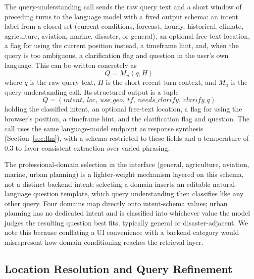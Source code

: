 \documentclass[sigconf,natbib=true,anonymous=true]{acmart}
\begin{document}
The query-understanding call sends the raw query text and a short window of preceding turns to the language model with a fixed output schema: an intent label from a closed set (current conditions, forecast, hourly, historical, climate, agriculture, aviation, marine, disaster, or general), an optional free-text location, a flag for using the current position instead, a timeframe hint, and, when the query is too ambiguous, a clarification flag and question in the user's own language. This can be written concretely as
\begin{equation}
  Q = M_{u}(q, H)
  \label{eq:understanding}
\end{equation}
where $q$ is the raw query text, $H$ is the short recent-turn context, and $M_u$ is the query-understanding call. Its structured output is a tuple
\[
  Q = (\mathit{intent},\ \mathit{loc},\ \mathit{use\_geo},\ \mathit{tf},\ \mathit{needs\_clarify},\ \mathit{clarify\_q})
\]
holding the classified intent, an optional free-text location, a flag for using the browser's position, a timeframe hint, and the clarification flag and question. The call uses the same language-model endpoint as response synthesis (Section~\ref{sec:llm}), with a schema restricted to these fields and a temperature of 0.3 to favor consistent extraction over varied phrasing.

The professional-domain selection in the interface (general, agriculture, aviation, marine, urban planning) is a lighter-weight mechanism layered on this schema, not a distinct backend intent: selecting a domain inserts an editable natural-language question template, which query understanding then classifies like any other query. Four domains map directly onto intent-schema values; urban planning has no dedicated intent and is classified into whichever value the model judges the resulting question best fits, typically general or disaster-adjacent. We note this because conflating a UI convenience with a backend category would misrepresent how domain conditioning reaches the retrieval layer.

\subsection{Location Resolution and Query Refinement}
\end{document}
